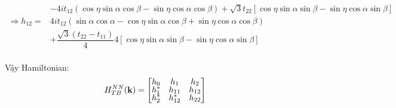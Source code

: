 \documentclass{article}
\begin{document}
\begin{align*}
                         & - 4it_{12}(\cos\eta\sin\alpha\cos\beta - \sin\eta\cos\alpha\cos\beta) + \sqrt{3} t_{22}\left[ \cos\eta\sin\alpha\sin\beta - \sin\eta\cos\alpha\sin\beta \right]                                                                                                         \\
    \Rightarrow h_{12} = & 4it_{12}(\sin\alpha\cos\alpha - \cos\eta\sin\alpha\cos\beta + \sin\eta\cos\alpha\cos\beta )                                                                                                                                                                             \\
                         & + \dfrac{\sqrt{3} (t_{22} - t_{11}) }{4}4\left[ \cos\eta\sin\alpha\sin\beta - \sin\eta\cos\alpha\sin\beta  \right]                                                                                                                                                      \\
\end{align*}

\clearpage
Vậy Hamiltonian:
\begin{align}
    H_{TB}^{NN}(\mathbf{k}) =
    \begin{bmatrix}
        \renewcommand{\arraystretch}{0.72}
        h_0   & h_1      & h_2    \\
        h_1^* & h_{11}   & h_{12} \\
        h_2^* & h_{12}^* & h_{22} \\
    \end{bmatrix}
\end{align}
\end{document}
